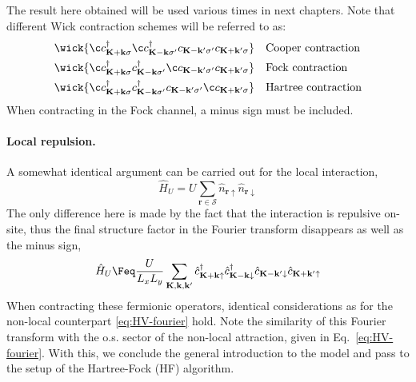 \color{tabred}

The result here obtained will be used various times in next chapters. Note that different Wick contraction schemes will be referred to as:
\begin{align}
	&\wick{
		\c
		c_{\mathbf{K}+\mathbf{k} \sigma}^\dagger 
		\c
		c_{\mathbf{K}-\mathbf{k} \sigma'}^\dagger c_{\mathbf{K}-\mathbf{k}' \sigma'} c_{\mathbf{K}+\mathbf{k}'\sigma}
	} &&\text{Cooper contraction} \label{eq:reciprocal-space-cooper-contraction} \\
	&\wick{
		\c
		c_{\mathbf{K}+\mathbf{k} \sigma}^\dagger 
		c_{\mathbf{K}-\mathbf{k} \sigma'}^\dagger
		\c
		c_{\mathbf{K}-\mathbf{k}' \sigma'} c_{\mathbf{K}+\mathbf{k}'\sigma}
	} &&\text{Fock contraction} \label{eq:reciprocal-space-fock-contraction} \\
	&\wick{
		\c
		c_{\mathbf{K}+\mathbf{k} \sigma}^\dagger 
		c_{\mathbf{K}-\mathbf{k} \sigma'}^\dagger c_{\mathbf{K}-\mathbf{k}' \sigma'}
		\c
		c_{\mathbf{K}+\mathbf{k}'\sigma}
	} &&\text{Hartree contraction} \label{eq:reciprocal-space-hartree-contraction}
\end{align}
When contracting in the Fock channel, a minus sign must be included.

\paragraph{Local repulsion.}\label{subsec:mft-discussion-reciprocal-local}

A somewhat identical argument can be carried out for the local interaction,
\[
\hat H_U = U \sum_{\mathbf{r} \in \mathcal{S}} \hat n_{\mathbf{r}\uparrow} \hat n_{\mathbf{r}\downarrow}
\]
The only difference here is made by the fact that the interaction is repulsive on-site, thus the final structure factor in the Fourier transform disappears as well as the minus sign,
\begin{equation} \label{HU-Fourier}
	\hat H_U \Feq \frac{U}{L_x L_y}
	\sum_{\mathbf{K}, \mathbf{k}, \mathbf{k}'} \hat c_{\mathbf{K}+\mathbf{k} \uparrow}^\dagger \hat c_{\mathbf{K}-\mathbf{k} \downarrow}^\dagger \hat c_{\mathbf{K}-\mathbf{k}' \downarrow} \hat c_{\mathbf{K}+\mathbf{k}' \uparrow}
\end{equation}
When contracting these fermionic operators, identical considerations as for the non-local counterpart \eqref{eq:HV-fourier} hold. Note the similarity of this Fourier transform with the o.s. sector of the non-local attraction, given in Eq.~\eqref{eq:HV-fourier}. With this, we conclude the general introduction to the model and pass to the setup of the Hartree-Fock (HF) algorithm.
































